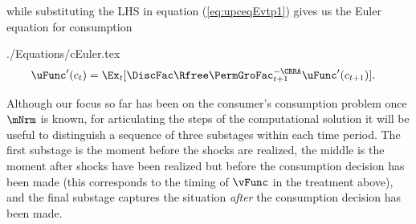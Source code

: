 \documentclass[titlepage, headings=optiontotocandhead]{\econtex}
\begin{document}
while substituting the LHS in equation (\ref{eq:upceqEvtp1})
gives us the Euler equation for consumption\newcommand{\substage}{substage}
\begin{verbatimwrite}{./Equations/cEuler.tex}
  \begin{equation}\begin{gathered}\begin{aligned}
        \uFunc^{\prime}({c}_{t})  & = \Ex_{t}[\DiscFac\Rfree \PermGroFac_{t+1}^{-\CRRA}\uFunc^{\prime}({c}_{t+1})]. \label{eq:cEuler}
      \end{aligned}\end{gathered}\end{equation}
\end{verbatimwrite}
\unskip
Although our focus so far has been on the consumer's consumption problem once $\mNrm$ is known, for articulating the steps of the computational solution it will be useful to distinguish a sequence of three {\substage}s within each time period.  The first substage is the moment before the shocks are realized, the middle is the moment after shocks have been realized but before the consumption decision has been made (this corresponds to the timing of $\vFunc$ in the treatment above), and the final substage captures the situation \textit{after} the consumption decision has been made.
\end{document}
